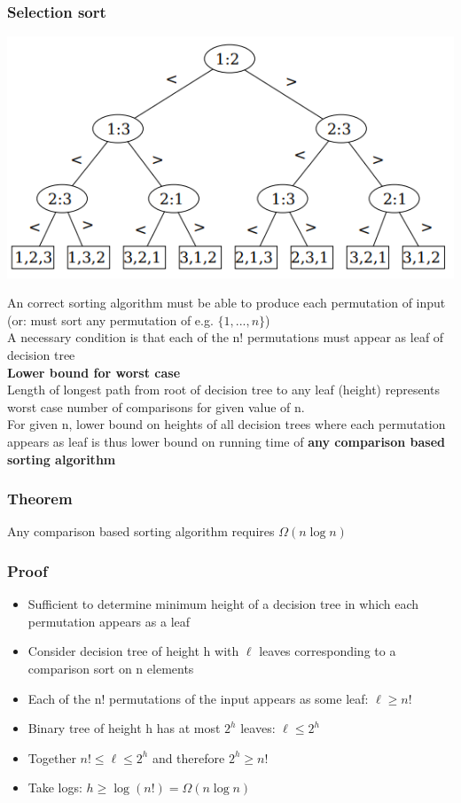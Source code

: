 \documentclass{article}[18pt]
\begin{document}
\subsubsection{Selection sort }
\begin{center}
\includegraphics[scale=0.7]{selection}
\end{center}
An correct sorting algorithm must be able to produce each permutation of input (or: must sort any permutation of e.g. $\{1,...,n\}$)\\
A necessary condition is that each of the n! permutations must appear as leaf of decision tree\\
\textbf{Lower bound for worst case}\\
Length of longest path from root of decision tree to any leaf (height) represents worst case number of comparisons for given value of n.\\
For given n, lower bound on heights of all decision trees where each permutation appears as leaf is thus lower bound on running time of \textbf{any comparison based sorting algorithm}\\
\subsubsection{Theorem}
Any comparison based sorting algorithm requires $\Omega (n\log n)$
\subsubsection{Proof}
\begin{itemize}
\item Sufficient to determine minimum height of a decision tree in which each permutation appears as a leaf
\item Consider decision tree of height h with $\ell$ leaves corresponding to a comparison sort on n elements
\item Each of the n! permutations of the input appears as some leaf: $\ell\geqslant n!$
\item Binary tree of height h has at most $2^h$ leaves: $\ell\leqslant 2^h$
\item Together $n!\leqslant\ell\leqslant 2^h$ and therefore $2^h\geqslant n!$
\item Take logs: $h\geqslant \log (n!)=\Omega(n\log n)$
\end{itemize}
\end{document}
